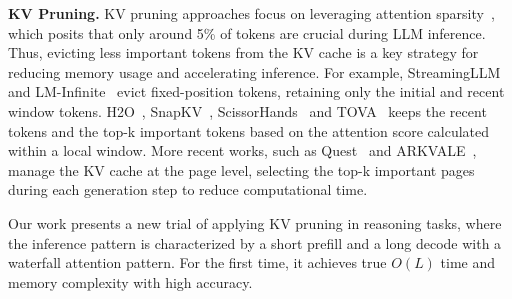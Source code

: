 \textbf{KV Pruning.} KV pruning approaches focus on leveraging attention sparsity~\cite{zhang2023h2o, ge2023model, jiang2024minference, cai2024pyramidkv, fu2024lazyllm, xiao2024duoattention}, which posits that only around 5\% of tokens are crucial during LLM inference. Thus, evicting less important tokens from the KV cache is a key strategy for reducing memory usage and accelerating inference. For example, StreamingLLM~\cite{xiao2023sink} and LM-Infinite~\cite{han2024lm} evict fixed-position tokens, retaining only the initial and recent window tokens. H2O~\cite{zhang2023h2o}, SnapKV~\cite{li2024snapkv}, ScissorHands~\cite{liu2024scissorhands} and TOVA~\cite{oren2024transformers} keeps the recent tokens and the top-k important tokens based on the attention score calculated within a local window. More recent works, such as Quest~\cite{tang2024quest} and ARKVALE~\cite{chenarkvale}, manage the KV cache at the page level, selecting the top-k important pages during each generation step to reduce computational time.

Our work presents a new trial of applying KV pruning in reasoning tasks, where the inference pattern is characterized by a short prefill and a long decode with a waterfall attention pattern. For the first time, it achieves true $O(L)$ time and memory complexity with high accuracy.


